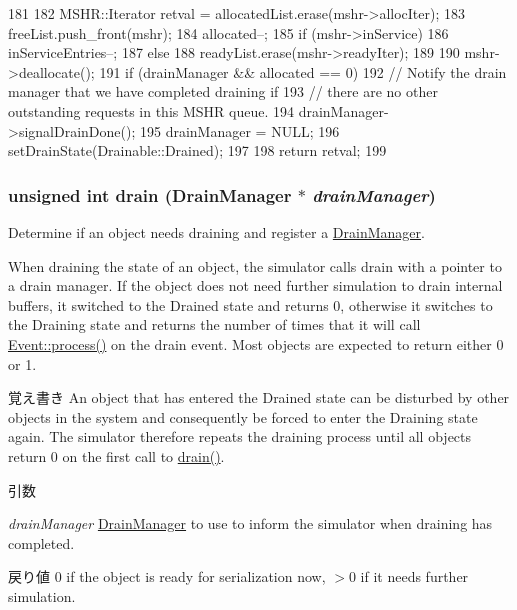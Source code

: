 \begin{DoxyCode}
181 {
182     MSHR::Iterator retval = allocatedList.erase(mshr->allocIter);
183     freeList.push_front(mshr);
184     allocated--;
185     if (mshr->inService) {
186         inServiceEntries--;
187     } else {
188         readyList.erase(mshr->readyIter);
189     }
190     mshr->deallocate();
191     if (drainManager && allocated == 0) {
192         // Notify the drain manager that we have completed draining if
193         // there are no other outstanding requests in this MSHR queue.
194         drainManager->signalDrainDone();
195         drainManager = NULL;
196         setDrainState(Drainable::Drained);
197     }
198     return retval;
199 }
\end{DoxyCode}
\hypertarget{classMSHRQueue_aa8a18d230dba7a674ac8a0b4f35bc36a}{
\subsubsection[{drain}]{\setlength{\rightskip}{0pt plus 5cm}unsigned int drain ({\bf DrainManager} $\ast$ {\em drainManager})}}
\label{classMSHRQueue_aa8a18d230dba7a674ac8a0b4f35bc36a}
Determine if an object needs draining and register a \hyperlink{classDrainManager}{DrainManager}.

When draining the state of an object, the simulator calls drain with a pointer to a drain manager. If the object does not need further simulation to drain internal buffers, it switched to the Drained state and returns 0, otherwise it switches to the Draining state and returns the number of times that it will call \hyperlink{classEvent_a142b75b68a6291400e20fb0dd905b1c8}{Event::process()} on the drain event. Most objects are expected to return either 0 or 1.

\begin{DoxyNote}{覚え書き}
An object that has entered the Drained state can be disturbed by other objects in the system and consequently be forced to enter the Draining state again. The simulator therefore repeats the draining process until all objects return 0 on the first call to \hyperlink{classMSHRQueue_aa8a18d230dba7a674ac8a0b4f35bc36a}{drain()}.
\end{DoxyNote}

\begin{DoxyParams}{引数}
\item[{\em drainManager}]\hyperlink{classDrainManager}{DrainManager} to use to inform the simulator when draining has completed.\end{DoxyParams}
\begin{DoxyReturn}{戻り値}
0 if the object is ready for serialization now, $>$0 if it needs further simulation. 
\end{DoxyReturn}


